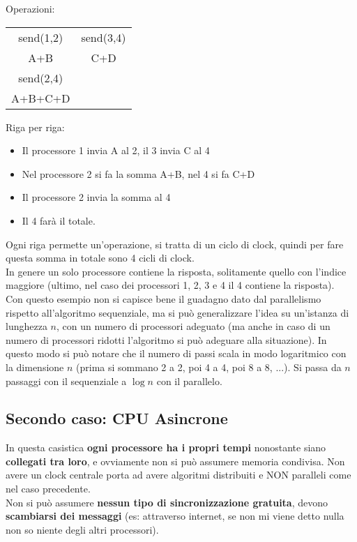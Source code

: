 Operazioni: 

\begin{tabular}{c c}
	send(1,2) & send(3,4) \\
	A+B & C+D \\
	send(2,4) & \\
	A+B+C+D &
\end{tabular}

\newpage

Riga per riga: 
\begin{itemize}
	\item Il processore 1 invia A al 2, il 3 invia C al 4
	\item Nel processore 2 si fa la somma A+B, nel 4 si fa C+D
	\item Il processore 2 invia la somma al 4 
	\item Il 4 farà il totale.
\end{itemize}

Ogni riga permette un'operazione, si tratta di un ciclo di clock, quindi per fare questa somma in totale sono 4 cicli di clock. \\

In genere un solo processore contiene la risposta, solitamente quello con l'indice maggiore (ultimo, nel caso dei processori 1, 2, 3 e 4 il 4 contiene la risposta). \\

Con questo esempio non si capisce bene il guadagno dato dal parallelismo rispetto all'algoritmo sequenziale, ma si può generalizzare l'idea su un'istanza di lunghezza $n$, con un numero di processori adeguato (ma anche in caso di un numero di processori ridotti l'algoritmo si può adeguare alla situazione). In questo modo si può notare che il numero di passi scala in modo logaritmico con la dimensione $n$ (prima si sommano 2 a 2, poi 4 a 4, poi 8 a 8, ...). Si passa da $n$ passaggi con il sequenziale a $\log n$ con il parallelo. \\

\newpage

\subsection*{Secondo caso: CPU Asincrone}
In questa casistica \textbf{ogni processore ha i propri tempi} nonostante siano \textbf{collegati tra loro}, e ovviamente non si può assumere memoria condivisa. Non avere un clock centrale porta ad avere algoritmi distribuiti e NON paralleli come nel caso precedente.\\
Non si può assumere \textbf{nessun tipo di sincronizzazione gratuita}, devono \textbf{scambiarsi dei messaggi} (es: attraverso internet, se non mi viene detto nulla non so niente degli altri processori).\\

